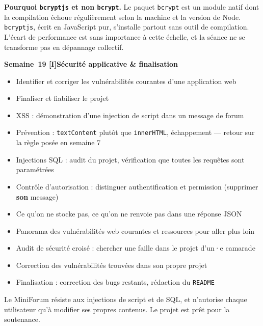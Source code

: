 \documentclass[a4paper,11pt]{article}
\newcommand{\semainetitre}[4]{%
  \needspace{9\baselineskip}%
  \vspace{8pt}
  \noindent
  \begin{tcolorbox}[
    enhanced, colback=cfptBlack, colframe=cfptBlack,
    boxrule=0pt, arc=3pt, boxsep=0pt,
    left=8pt, right=90pt, top=4pt, bottom=4pt,
    overlay={%
      \node[anchor=east, fill=cfptYellow, text=cfptBlack,
            rounded corners=2pt, inner xsep=6pt, inner ysep=3pt,
            font=\scriptsize\bfseries]
        at ([xshift=-6pt]frame.east) {#3};}
  ]
  \color{white}\bfseries\small Semaine~#1 \quad\textcolor{cfptYellow}{[#4]}\quad #2
  \end{tcolorbox}
  \vspace{-4pt}
}
\newcommand{\contenutitre}[1]{%
  \vspace{4pt}
  \noindent{\small\color{accentBlue}\textbf{#1}}\vspace{2pt}
}
\begin{document}
\begin{tcolorbox}[intro]
\small
\textbf{Pourquoi \texttt{bcryptjs} et non \texttt{bcrypt}.} Le paquet \texttt{bcrypt} est un module natif dont la compilation échoue régulièrement selon la machine et la version de Node. \texttt{bcryptjs}, écrit en JavaScript pur, s'installe partout sans outil de compilation. L'écart de performance est sans importance à cette échelle, et la séance ne se transforme pas en dépannage collectif.
\end{tcolorbox}

\newpage

\semainetitre{19}{Sécurité applicative \& finalisation}{3h cours / 4h TP}{I}
\begin{tcolorbox}[semaine]
\begin{tcolorbox}[objectifs]
\begin{itemize}
  \item Identifier et corriger les vulnérabilités courantes d'une application web
  \item Finaliser et fiabiliser le projet
\end{itemize}
\end{tcolorbox}
\vspace{4pt}
\contenutitre{Cours}
\begin{itemize}
  \item XSS : démonstration d'une injection de script dans un message de forum
  \item Prévention : \texttt{textContent} plutôt que \texttt{innerHTML}, échappement --- retour sur la règle posée en semaine 7
  \item Injections SQL : audit du projet, vérification que toutes les requêtes sont paramétrées
  \item Contrôle d'autorisation : distinguer authentification et permission (supprimer \textbf{son} message)
  \item Ce qu'on ne stocke pas, ce qu'on ne renvoie pas dans une réponse JSON
  \item Panorama des vulnérabilités web courantes et ressources pour aller plus loin
\end{itemize}
\contenutitre{Travaux pratiques}
\begin{itemize}
  \item Audit de sécurité croisé : chercher une faille dans le projet d'un·e camarade
  \item Correction des vulnérabilités trouvées dans son propre projet
  \item Finalisation : correction des bugs restants, rédaction du \texttt{README}
\end{itemize}
\end{tcolorbox}
\begin{tcolorbox}[filrouge={Un forum qui tient debout}]
\small Le MiniForum résiste aux injections de script et de SQL, et n'autorise chaque utilisateur qu'à modifier ses propres contenus. Le projet est prêt pour la soutenance.
\end{tcolorbox}
\end{document}
